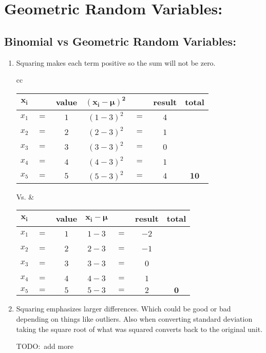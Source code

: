 \documentclass[12pt]{article}
\newcommand{\negBi}[3][2]{{(#2- #3)}^{#1}}
\newcommand{\negBiBold}[3][2]{\bm{{(#2- #3)}^{#1}} }
\begin{document}
\section*{Geometric Random Variables:}

  \subsection*{Binomial vs Geometric Random Variables:}
\begin{enumerate}
  \item Squaring makes each term positive so the sum will not be zero.
  \begin{table}[h!]
  \begin{center}
  \begin{tabular}{cc}
    \begin{tabular}{ccccccc}
      \toprule
      $\bm{x_{i}}$ & \ & \textbf{value} & $\negBiBold{x_{i}}{\mu}$ &
      \ & \textbf{result} & \textbf{total} \\
      \midrule
      $x_{1}$ & $=$ & $1$ & $\negBi{1}{3}$ & $=$ & $4$ & \ \\
      $x_{2}$ & $=$ & $2$ & $\negBi{2}{3}$ & $=$ & $1$ & \ \\
      $x_{3}$ & $=$ & $3$ & $\negBi{3}{3}$ & $=$ & $0$ & \ \\
      $x_{4}$ & $=$ & $4$ & $\negBi{4}{3}$ & $=$ & $1$ & \ \\
      $x_{5}$ & $=$ & $5$ & $\negBi{5}{3}$ & $=$ & $4$ & $\bm{10}$ \\
      \bottomrule
    \end{tabular} Vs. &
    \begin{tabular}{ccccccc}
      \toprule
      $\bm{x_{i}}$ & \ & \textbf{value} & $\bm{x_{i} - \mu}$ &
      \ & \textbf{result} & \textbf{total}\\
      \midrule
      $x_{1}$ & $=$ & $1$ & $1 - 3$ & $=$ & $-2$ & \ \\
      $x_{2}$ & $=$ & $2$ & $2 - 3$ & $=$ & $-1$ & \ \\
      $x_{3}$ & $=$ & $3$ & $3 - 3$ & $=$ & $0$ & \ \\
      $x_{4}$ & $=$ & $4$ & $4 - 3$ & $=$ & $1$ & \ \\
      $x_{5}$ & $=$ & $5$ & $5 - 3$ & $=$ & $2$ & $\bm{0}$ \\
      \bottomrule
    \end{tabular}
  \end{tabular}
  \label{ComparisonTable}
  \end{center}
  \end{table}
  \item Squaring emphasizes larger differences. Which could be good or bad depending on things like outliers. Also when converting standard deviation taking the square root of what was squared converts back to the original unit.

    TODO:\ add more
\end{enumerate}

\end{document}

